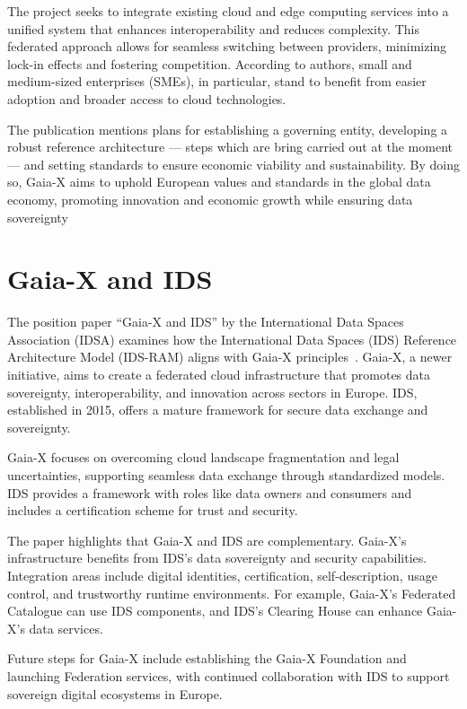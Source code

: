 The project seeks to integrate existing cloud and edge computing services into a unified system that enhances interoperability and reduces complexity.
This federated approach allows for seamless switching between providers, minimizing lock-in effects and fostering competition.
According to authors, small and medium-sized enterprises (SMEs), in particular, stand to benefit from easier adoption and broader access to cloud technologies.

The publication mentions plans for establishing a governing entity, developing a robust reference architecture --- steps which are bring carried out at the moment --- and setting standards to ensure economic viability and sustainability.
By doing so, Gaia-X aims to uphold European values and standards in the global data economy, promoting innovation and economic growth while ensuring data sovereignty

\section{Gaia-X and IDS}\label{sec:gaia-x-and-ids}

The position paper ``Gaia-X and IDS'' by the International Data Spaces Association (IDSA) examines how the International Data Spaces (IDS) Reference Architecture Model (IDS-RAM) aligns with Gaia-X principles~\cite{gaiax_and_ids}.
Gaia-X, a newer initiative, aims to create a federated cloud infrastructure that promotes data sovereignty, interoperability, and innovation across sectors in Europe.
IDS, established in 2015, offers a mature framework for secure data exchange and sovereignty.

Gaia-X focuses on overcoming cloud landscape fragmentation and legal uncertainties, supporting seamless data exchange through standardized models.
IDS provides a framework with roles like data owners and consumers and includes a certification scheme for trust and security.

The paper highlights that Gaia-X and IDS are complementary.
Gaia-X's infrastructure benefits from IDS's data sovereignty and security capabilities.
Integration areas include digital identities, certification, self-description, usage control, and trustworthy runtime environments.
For example, Gaia-X's Federated Catalogue can use IDS components, and IDS's Clearing House can enhance Gaia-X's data services.

Future steps for Gaia-X include establishing the Gaia-X Foundation and launching Federation services, with continued collaboration with IDS to support sovereign digital ecosystems in Europe.

